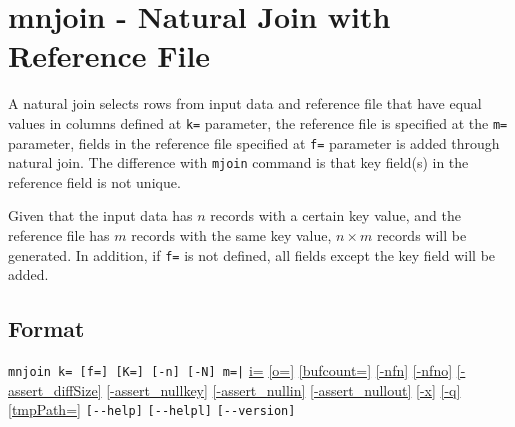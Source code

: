 
%

\section{mnjoin - Natural Join with Reference File\label{sect:mnjoin}}

A natural join selects rows from input data and reference file that have equal values in columns defined at \verb|k=| parameter, the reference file is specified at the \verb|m=| parameter, fields in the reference file specified at \verb|f=| parameter is added through natural join. The difference with \verb|mjoin| command is that key field(s) in the reference field is not unique.  

Given that the input data has $n$ records with a certain key value, and the reference file has $m$ records with the same key value, $n\times m$ records will be generated. In addition, if \verb|f=| is not defined, all fields except the key field will be added. 


\subsection*{Format}
\verb/mnjoin k= [f=] [K=] [-n] [-N] m=|/ 
\hyperref[sect:option_i]{i=}
\hyperref[sect:option_o]{[o=]}
\hyperref[sect:option_bufcount]{[bufcount=]} 
\hyperref[sect:option_nfn]{[-nfn]} 
\hyperref[sect:option_nfno]{[-nfno]}  
\hyperref[sect:option_assert_diffSize]{[-assert\_diffSize]}
\hyperref[sect:option_assert_nullkey]{[-assert\_nullkey]}
\hyperref[sect:option_assert_nullin]{[-assert\_nullin]}
\hyperref[sect:option_assert_nullout]{[-assert\_nullout]}
\hyperref[sect:option_x]{[-x]}
\hyperref[sect:option_q]{[-q]}
\hyperref[sect:option_option_tmppath]{[tmpPath=]}
\verb|[--help]|
\verb|[--helpl]|
\verb|[--version]|\\

